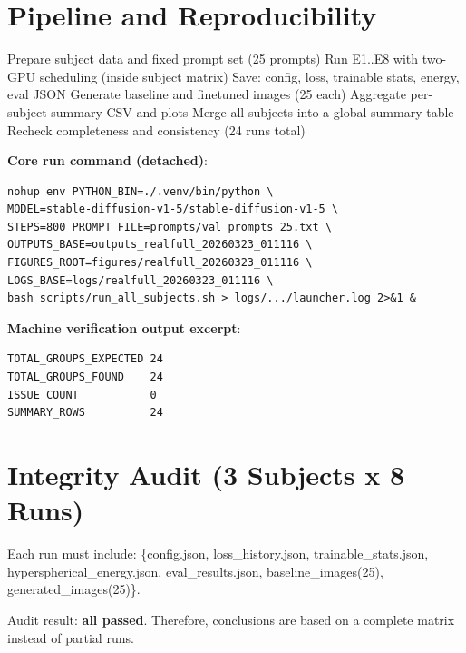 \documentclass[10pt,twocolumn]{article}
\begin{document}
\section{Pipeline and Reproducibility}
\begin{algorithm}[t]
\caption{End-to-end experimental protocol}
\begin{algorithmic}[1]
\State Prepare subject data and fixed prompt set (25 prompts)
  \State Run E1..E8 with two-GPU scheduling (inside subject matrix)
  \State Save: config, loss, trainable stats, energy, eval JSON
  \State Generate baseline and finetuned images (25 each)
  \State Aggregate per-subject summary CSV and plots
\EndFor
\State Merge all subjects into a global summary table
\State Recheck completeness and consistency (24 runs total)
\end{algorithmic}
\end{algorithm}

\textbf{Core run command (detached)}:
\begin{lstlisting}[style=compact]
nohup env PYTHON_BIN=./.venv/bin/python \
MODEL=stable-diffusion-v1-5/stable-diffusion-v1-5 \
STEPS=800 PROMPT_FILE=prompts/val_prompts_25.txt \
OUTPUTS_BASE=outputs_realfull_20260323_011116 \
FIGURES_ROOT=figures/realfull_20260323_011116 \
LOGS_BASE=logs/realfull_20260323_011116 \
bash scripts/run_all_subjects.sh > logs/.../launcher.log 2>&1 &
\end{lstlisting}

\textbf{Machine verification output excerpt}:
\begin{lstlisting}[style=compact]
TOTAL_GROUPS_EXPECTED 24
TOTAL_GROUPS_FOUND    24
ISSUE_COUNT           0
SUMMARY_ROWS          24
\end{lstlisting}

\section{Integrity Audit (3 Subjects x 8 Runs)}
Each run must include:
\{config.json, loss\_history.json, trainable\_stats.json,
hyperspherical\_energy.json, eval\_results.json, baseline\_images(25), generated\_images(25)\}.

Audit result: \textbf{all passed}. Therefore, conclusions are based on a complete matrix instead of partial runs.
\end{document}
